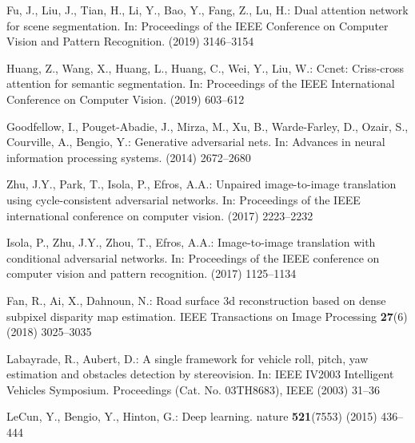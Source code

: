 \documentclass[runningheads]{llncs}
\begin{document}
\begin{thebibliography}{10}
	Fu, J., Liu, J., Tian, H., Li, Y., Bao, Y., Fang, Z., Lu, H.:
	\newblock Dual attention network for scene segmentation.
	\newblock In: Proceedings of the IEEE Conference on Computer Vision and Pattern
	Recognition. (2019)  3146--3154
	
	Huang, Z., Wang, X., Huang, L., Huang, C., Wei, Y., Liu, W.:
	\newblock Ccnet: Criss-cross attention for semantic segmentation.
	\newblock In: Proceedings of the IEEE International Conference on Computer
	Vision. (2019)  603--612
	
	Goodfellow, I., Pouget-Abadie, J., Mirza, M., Xu, B., Warde-Farley, D., Ozair,
	S., Courville, A., Bengio, Y.:
	\newblock Generative adversarial nets.
	\newblock In: Advances in neural information processing systems. (2014)
	2672--2680
	
	Zhu, J.Y., Park, T., Isola, P., Efros, A.A.:
	\newblock Unpaired image-to-image translation using cycle-consistent
	adversarial networks.
	\newblock In: Proceedings of the IEEE international conference on computer
	vision. (2017)  2223--2232
	
	Isola, P., Zhu, J.Y., Zhou, T., Efros, A.A.:
	\newblock Image-to-image translation with conditional adversarial networks.
	\newblock In: Proceedings of the IEEE conference on computer vision and pattern
	recognition. (2017)  1125--1134
	
	Fan, R., Ai, X., Dahnoun, N.:
	\newblock Road surface 3d reconstruction based on dense subpixel disparity map
	estimation.
	\newblock IEEE Transactions on Image Processing \textbf{27}(6) (2018)
	3025--3035
	
	Labayrade, R., Aubert, D.:
	\newblock A single framework for vehicle roll, pitch, yaw estimation and
	obstacles detection by stereovision.
	\newblock In: IEEE IV2003 Intelligent Vehicles Symposium. Proceedings (Cat. No.
	03TH8683), IEEE (2003)  31--36
	
	LeCun, Y., Bengio, Y., Hinton, G.:
	\newblock Deep learning.
	\newblock nature \textbf{521}(7553) (2015)  436--444
	
\end{thebibliography}
\end{document}

